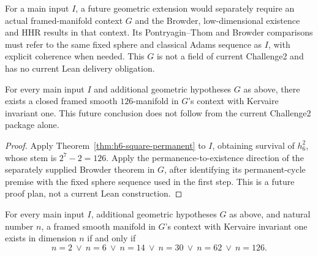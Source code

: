\begin{definition}
  \label{def:geometric-kervaire-input}
  \notready
  For a main input $I$, a future geometric extension would separately require
  an actual framed-manifold context $G$ and the Browder, low-dimensional
  existence and HHR results in that context. Its Pontryagin--Thom and Browder
  comparisons must refer to the same fixed sphere and classical Adams
  sequence as $I$, with explicit coherence when needed. This $G$ is not a
  field of current Challenge2 and has no current Lean delivery obligation.
\end{definition}

\begin{theorem}
  \label{thm:kervaire-126-conditional}
  \notready
  For every main input $I$ and additional geometric hypotheses $G$ as above,
  there exists a closed framed smooth $126$-manifold in $G$'s context with
  Kervaire invariant one. This future conclusion does not follow from the
  current Challenge2 package alone.
\end{theorem}

\begin{proof}
  Apply Theorem~\ref{thm:h6-square-permanent} to $I$, obtaining survival of
  $h_6^2$, whose stem is $2^7-2=126$. Apply the permanence-to-existence direction of
  the separately supplied Browder theorem in $G$, after identifying its
  permanent-cycle premise with the fixed sphere sequence used in the first
  step. This is a future proof plan, not a current Lean construction.
\end{proof}

\begin{corollary}
  \label{cor:kervaire-dimensions-exact}
  \notready
  For every main input $I$, additional geometric hypotheses $G$ as above,
  and natural number $n$, a framed smooth manifold in $G$'s context with
  Kervaire invariant one exists in
  dimension $n$ if and only if
  \[
    n=2\ \vee\ n=6\ \vee\ n=14\ \vee\ n=30\ \vee\ n=62\ \vee\ n=126.
  \]
\end{corollary}

